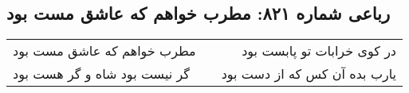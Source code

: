 \begin{center}
\section*{رباعی شماره ۸۲۱: مطرب خواهم که عاشق مست بود}
\label{sec:0821}
\begin{longtable}{l p{0.5cm} r}
مطرب خواهم که عاشق مست بود
&&
در کوی خرابات تو پابست بود
\\
گر نیست بود شاه و گر هست بود
&&
یارب بده آن کس که از دست بود
\\
\end{longtable}
\end{center}
